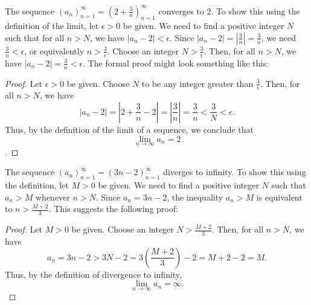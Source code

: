 \documentclass{article}
\begin{document}
\begin{example}\label{ex:limit-calculation}
The sequence \((a_n)_{n=1}^\infty = \left(2+\frac{3}{n}\right)_{n=1}^\infty\) converges to 2. To show this using the definition of the limit, let \(\epsilon > 0\) be given. We need to find a positive integer \(N\) such that for all \(n > N\), we have \(|a_n - 2| < \epsilon\).
Since \(|a_n - 2| = \left|\frac{3}{n}\right| = \frac{3}{n}\), we need \(\frac{3}{n} < \epsilon\), or equivalently \(n > \frac{3}{\epsilon}\). Choose an integer \(N > \frac{3}{\epsilon}\). Then, for all \(n > N\), we have \(|a_n - 2| = \frac{3}{n} < \epsilon\). The formal proof might look something like this:
\begin{proof}
Let \(\epsilon > 0\) be given. Choose \(N\) to be any integer greater than \(\frac{3}{\epsilon}\). Then, for all \(n > N\), we have
\[|a_n - 2| = \left|2 + \frac{3}{n} - 2\right| = \left|\frac{3}{n}\right| = \frac{3}{n} < \frac{3}{N} < \epsilon.\]
Thus, by the definition of the limit of a sequence, we conclude that
\[\lim_{n \to \infty} a_n = 2\].
\end{proof}
\end{example}

\begin{example}\label{ex:limit-calculation-2}
The sequence \((a_n)_{n=1}^\infty = (3n-2)_{n=1}^\infty\) diverges to infinity. To show this using the definition, let \(M > 0\) be given. We need to find a positive integer \(N\) such that \(a_n > M\) whenever \(n > N\).
Since \(a_n = 3n-2\), the inequality \(a_n > M\) is equivalent to \(n > \frac{M+2}{3}\). This suggests the following proof:
\begin{proof}
Let \(M > 0\) be given. Choose an integer \(N > \frac{M+2}{3}\). Then, for all \(n > N\), we have
\[a_n = 3n-2 > 3N-2 = 3\left(\frac{M+2}{3}\right)-2 = M+2-2 = M.\]
Thus, by the definition of divergence to infinity,
\[\lim_{n \to \infty} a_n = \infty.\]
\end{proof}
\end{example}
\end{document}

